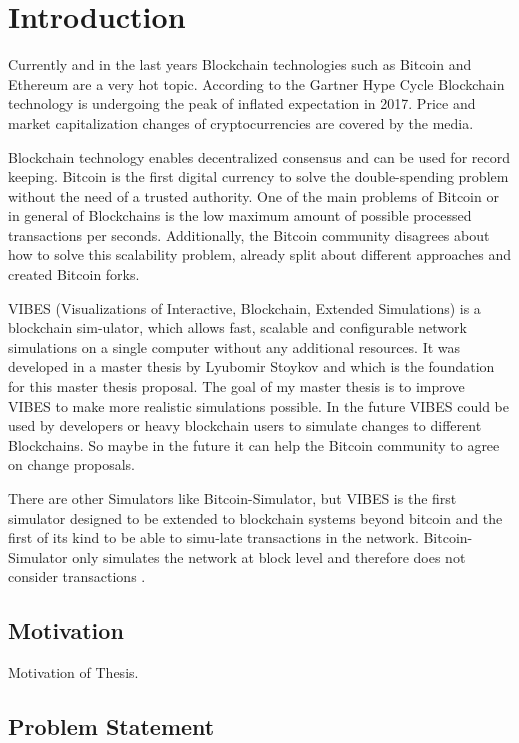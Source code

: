 \chapter{Introduction} 
\label{chapter:introduction}

Currently and in the last years Blockchain technologies such as Bitcoin and Ethereum are a very hot topic. According to the Gartner Hype Cycle \cite{gartner} Blockchain technology is undergoing the peak of inflated expectation in 2017. Price and market capitalization changes of cryptocurrencies are covered by the media.

Blockchain technology enables decentralized consensus and can be used for record keeping. Bitcoin is the first digital currency to solve the double-spending problem without the need of a trusted authority. One of the main problems of Bitcoin or in general of Blockchains is the low maximum amount of possible processed transactions per seconds. Additionally, the Bitcoin community disagrees about how to solve this scalability problem, already split about different approaches and created Bitcoin forks.

VIBES (Visualizations of Interactive, Blockchain, Extended Simulations) is a blockchain sim-ulator, which allows fast, scalable and configurable network simulations on a single
computer without any additional resources. It was developed in a master thesis by Lyubomir Stoykov \cite{stoykov2018} and which is the foundation for this master thesis proposal. The goal of my master thesis is to improve VIBES to make more realistic simulations possible. In the future VIBES could be used by developers or heavy blockchain users to simulate changes to different Blockchains. So maybe in the future it can help the Bitcoin community to agree on change proposals.

There are other Simulators like Bitcoin-Simulator, but VIBES is the first simulator designed to be extended to blockchain systems beyond bitcoin and the first of its kind to be able to simu-late transactions in the network. Bitcoin-Simulator only simulates the network at block level and therefore does not consider transactions \cite{sec&perf}.

\section{Motivation} 
\label{sec:motivation}

Motivation of Thesis.

\section{Problem Statement} 
\label{sec:problemStatement}

